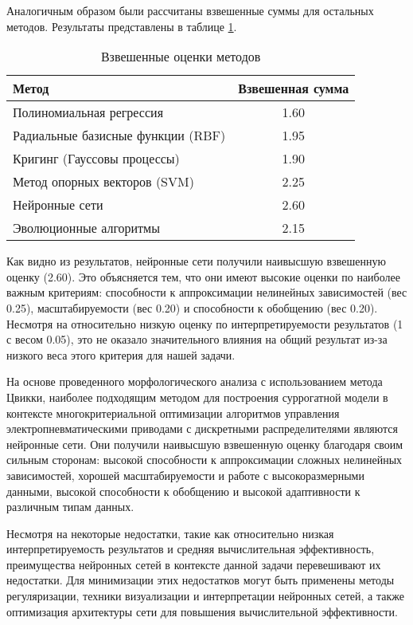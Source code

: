 Аналогичным образом были рассчитаны взвешенные суммы для остальных методов.
Результаты представлены в таблице \ref{tab:weighted_scores}.

\begin{table}[h]
    \centering
    \caption{Взвешенные оценки методов}
    \begin{tabular}{lc}
        \midrule
        Метод                             & Взвешенная сумма \\
        \midrule
        Полиномиальная регрессия          & 1.60             \\
        Радиальные базисные функции (RBF) & 1.95             \\
        Кригинг (Гауссовы процессы)       & 1.90             \\
        Метод опорных векторов (SVM)      & 2.25             \\
        Нейронные сети                    & 2.60             \\
        Эволюционные алгоритмы            & 2.15             \\
        \hline
    \end{tabular}
    \label{tab:weighted_scores}
\end{table}



Как видно из результатов, нейронные сети получили наивысшую взвешенную оценку
(2.60). Это объясняется тем, что они имеют высокие оценки по наиболее важным
критериям: способности к аппроксимации нелинейных зависимостей (вес 0.25),
масштабируемости (вес 0.20) и способности к обобщению (вес 0.20). Несмотря на
относительно низкую оценку по интерпретируемости результатов (1 с весом 0.05),
это не оказало значительного влияния на общий результат из-за низкого веса этого
критерия для нашей задачи.

На основе проведенного морфологического анализа с использованием метода
Цвикки, наиболее подходящим методом для построения суррогатной модели
в контексте многокритериальной оптимизации алгоритмов управления
электропневматическими приводами с дискретными распределителями
являются нейронные сети. Они получили наивысшую взвешенную оценку
благодаря своим сильным сторонам: высокой способности к аппроксимации
сложных нелинейных зависимостей, хорошей масштабируемости и работе с
высокоразмерными данными, высокой способности к обобщению и высокой
адаптивности к различным типам данных.

Несмотря на некоторые недостатки, такие как относительно низкая интерпретируемость
результатов и средняя вычислительная эффективность,
преимущества нейронных сетей в контексте данной задачи перевешивают
их недостатки. Для минимизации этих недостатков могут быть применены методы
регуляризации, техники визуализации и интерпретации нейронных сетей, а
также оптимизация архитектуры сети для повышения вычислительной эффективности.